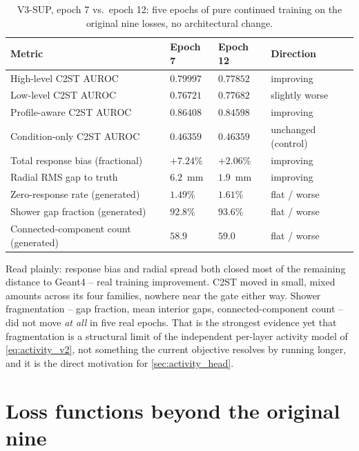 \documentclass[10pt,a4paper]{article}
\begin{document}
\begin{table}[ht]
\centering
\caption{V3-SUP, epoch 7 vs.\ epoch 12: five epochs of pure continued training on the original nine losses, no architectural change.}
\label{tab:epoch_trend}
\begin{tabularx}{\textwidth}{@{}p{}p{}p{}Y@{}}
\toprule
Metric & Epoch 7 & Epoch 12 & Direction \\
\midrule
High-level C2ST AUROC & $0.79997$ & $0.77852$ & improving \\
Low-level C2ST AUROC & $0.76721$ & $0.77682$ & slightly worse \\
Profile-aware C2ST AUROC & $0.86408$ & $0.84598$ & improving \\
Condition-only C2ST AUROC & $0.46359$ & $0.46359$ & unchanged (control) \\
Total response bias (fractional) & $+7.24\%$ & $+2.06\%$ & improving \\
Radial RMS gap to truth & $6.2$~mm & $1.9$~mm & improving \\
Zero-response rate (generated) & $1.49\%$ & $1.61\%$ & flat / worse \\
Shower gap fraction (generated) & $92.8\%$ & $93.6\%$ & flat / worse \\
Connected-component count (generated) & $58.9$ & $59.0$ & flat / worse \\
\bottomrule
\end{tabularx}
\end{table}

Read plainly: response bias and radial spread both closed most of the remaining distance to Geant4 -- real training improvement. C2ST moved in small, mixed amounts across its four families, nowhere near the gate either way. Shower fragmentation -- gap fraction, mean interior gaps, connected-component count -- did not move \emph{at all} in five real epochs. That is the strongest evidence yet that fragmentation is a structural limit of the independent per-layer activity model of \cref{eq:activity_v2}, not something the current objective resolves by running longer, and it is the direct motivation for \cref{sec:activity_head}.

\section{Loss functions beyond the original nine}
\label{sec:beyond_nine}
\end{document}

